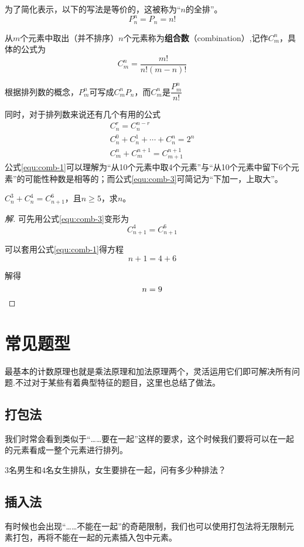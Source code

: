 为了简化表示，以下的写法是等价的，这被称为“$n$的全排”。\[P_n^n=P_n=n!\]

从$m$个元素中取出（并不排序）$n$个元素称为\textbf{组合数}（combination）,记作$C_m^n$，具体的公式为\[C_m^n=\frac{m!}{n!(m-n)!}\]

根据排列数的概念，$P_m^n$可写成$C_m^nP_n$，而$C_m^n$是$\dfrac{P_m^n}{n!}$

同时，对于排列数来说还有几个有用的公式
\begin{gather}
	C_n^r=C_n^{n-r} \label{equ:comb-1} \\
	C_n^0+C_n^1+\cdots+C_n^n=2^n \label{equ:comb-2} \\
	C_m^n+C_m^{n+1}=C_{m+1}^{n+1} \label{equ:comb-3}
\end{gather}
公式\eqref{equ:comb-1}可以理解为“从10个元素中取4个元素”与“从10个元素中留下6个元素”的可能性种数是相等的；而公式\eqref{equ:comb-3}可简记为“下加一，上取大”。

\begin{example}
	$C_n^3+C_n^4=C_{n+1}^6$，且$n\geq5$，求$n$。
\end{example}

\begin{proof}[解]
	可先用公式\eqref{equ:comb-3}变形为\[C_{n+1}^4=C_{n+1}^6\]

	可以套用公式\eqref{equ:comb-1}得方程\[n+1=4+6\]

	解得\[n=9\qedhere\]
\end{proof}

\section{常见题型}
最基本的计数原理也就是乘法原理和加法原理两个，灵活运用它们即可解决所有问题.不过对于某些有着典型特征的题目，这里也总结了做法。

\subsection{打包法}
我们时常会看到类似于“\ldots\ldots 要在一起”这样的要求，这个时候我们要将可以在一起的元素看成一整个元素进行排列。

\begin{example}
	$3$名男生和$4$名女生排队，女生要排在一起，问有多少种排法？
\end{example}

\subsection{插入法}
有时候也会出现“\ldots\ldots 不能在一起”的奇葩限制，我们也可以使用打包法将无限制元素打包，再将不能在一起的元素插入包中元素。

